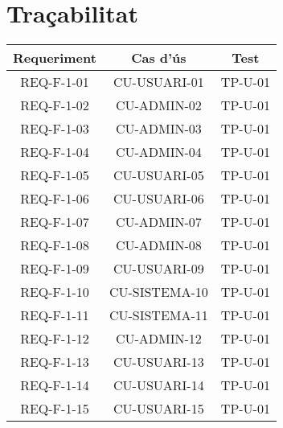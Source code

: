 \section{Traçabilitat}\label{sec:intro}

\begin{center}
\begin{tabular}{|c|c|c|}
\hline
{\cellcolor[gray]{.8} \bf Requeriment} & {\cellcolor[gray]{.8} \bf Cas d'ús} & {\cellcolor[gray]{.8} \bf Test}  \\
\hline
REQ-F-1-01 & CU-USUARI-01 & TP-U-01 \\
\hline
REQ-F-1-02 & CU-ADMIN-02 & TP-U-01 \\
\hline
REQ-F-1-03 & CU-ADMIN-03 & TP-U-01 \\
\hline
REQ-F-1-04 & CU-ADMIN-04 & TP-U-01 \\
\hline
REQ-F-1-05 & CU-USUARI-05 & TP-U-01 \\
\hline
REQ-F-1-06 & CU-USUARI-06 & TP-U-01 \\
\hline
REQ-F-1-07 & CU-ADMIN-07 & TP-U-01 \\
\hline
REQ-F-1-08 & CU-ADMIN-08 & TP-U-01 \\
\hline
REQ-F-1-09 & CU-USUARI-09 & TP-U-01 \\
\hline
REQ-F-1-10 & CU-SISTEMA-10 & TP-U-01 \\
\hline
REQ-F-1-11 & CU-SISTEMA-11 & TP-U-01 \\
\hline
REQ-F-1-12 & CU-ADMIN-12 & TP-U-01 \\
\hline
REQ-F-1-13 & CU-USUARI-13 & TP-U-01 \\
\hline
REQ-F-1-14 & CU-USUARI-14 & TP-U-01 \\
\hline
REQ-F-1-15 & CU-USUARI-15 & TP-U-01 \\
\hline

\end{tabular}
\end{center}
